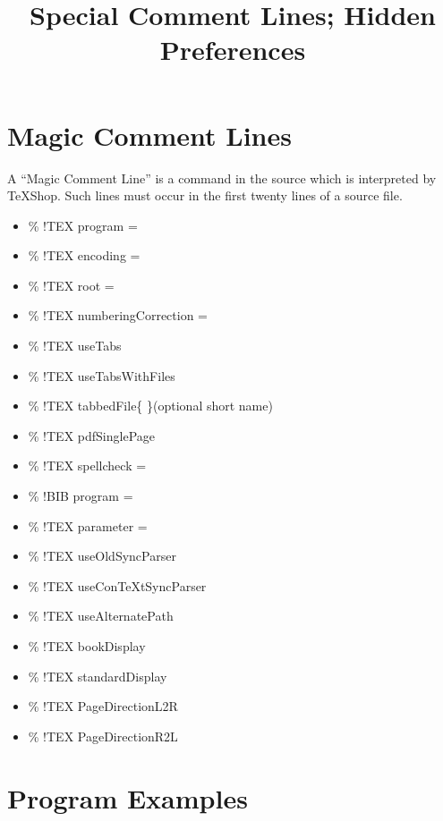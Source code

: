 \documentclass[11pt, oneside]{article}   	%
\title{Special Comment Lines; Hidden Preferences}
\date{}							%
\begin{document}
\maketitle
\section{Magic Comment Lines}
A ``Magic Comment Line'' is a command in the source which is interpreted by TeXShop. Such lines must occur in the first twenty lines of a source file.

\begin{itemize}
\item \% !TEX program =
\item \% !TEX encoding =
\item \% !TEX root =
\item	\% !TEX numberingCorrection = 
\item \% !TEX useTabs
\item \% !TEX useTabsWithFiles
\item \% !TEX tabbedFile\{ \}(optional short name)
\item \% !TEX pdfSinglePage
\item \% !TEX spellcheck =
\item \% !BIB program =
\item \% !TEX parameter =
\item \% !TEX useOldSyncParser
\item \% !TEX useConTeXtSyncParser
\item \% !TEX useAlternatePath
\item \% !TEX bookDisplay
\item \% !TEX standardDisplay
\item \% !TEX PageDirectionL2R
\item	\% !TEX PageDirectionR2L

\end{itemize}

\section{Program Examples}
\end{document}
